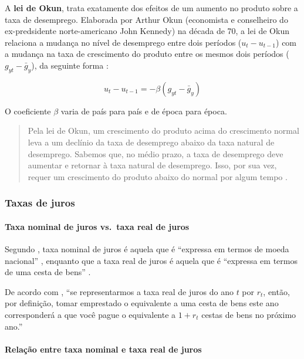 \documentclass[]{article}
\let\oldparagraph\paragraph
\renewcommand{\paragraph}[1]{\oldparagraph{#1}\mbox{}}
\begin{document}
A \textbf{lei de Okun}, trata exatamente dos efeitos de um aumento no
produto sobre a taxa de desemprego. Elaborada por Arthur Okun
(economista e conselheiro do ex-predsidente norte-americano John
Kennedy) na década de 70, a lei de Okun relaciona a mudança no nível de
desemprego entre dois períodos (\(u_t - u_{t-1}\)) com a mudança na taxa
de crescimento do produto entre os mesmos dois períodos
(\(g_{yt} - \bar{g}_y\)), da seguinte forma \cite[p.~168]{blanchard}:

\[u_t - u_{t-1} = -\beta(g_{yt} - \bar{g}_y)\]

O coeficiente \(\beta\) varia de país para país e de época para época.

\begin{quote}
Pela lei de Okun, um crescimento do produto acima do crescimento normal
leva a um declínio da taxa de desemprego abaixo da taxa natural de
desemprego. Sabemos que, no médio prazo, a taxa de desemprego deve
aumentar e retornar à taxa natural de desemprego. Isso, por sua vez,
requer um crescimento do produto abaixo do normal por algum tempo
\cite[p.~492]{blanchard}.
\end{quote}

\subsubsection{Taxas de juros}\label{taxas-de-juros}

\paragraph{Taxa nominal de juros vs.~taxa real de
juros}\label{taxa-nominal-de-juros-vs.taxa-real-de-juros}

Segundo , taxa nominal de juros é aquela que
é ``expressa em termos de moeda nacional'' \cite[p.~274]{blanchard},
enquanto que a taxa real de juros é aquela que é ``expressa em termos de
uma cesta de bens'' \cite[p.~274]{blanchard}.

De acordo com , ``se representarmos a taxa
real de juros do ano \(t\) por \(r_t\), então, por definição, tomar
emprestado o equivalente a uma cesta de bens este ano corresponderá a
que você pague o equivalente a \(1 + r_t\) cestas de bens no próximo
ano.''

\paragraph{Relação entre taxa nominal e taxa real de
juros}\label{relacao-entre-taxa-nominal-e-taxa-real-de-juros}
\end{document}
